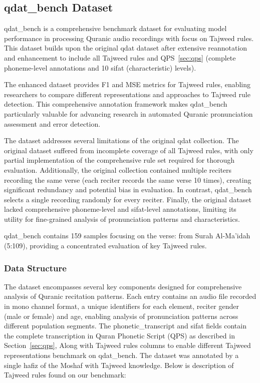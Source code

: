 \subsection{qdat\_bench Dataset}
\label{sec:qdat_bench}

qdat\_bench is a comprehensive benchmark dataset for evaluating model performance in processing Quranic audio recordings with focus on Tajweed rules. This dataset builds upon the original qdat dataset \cite{osman2021qdat} after extensive reannotation and enhancement to include all Tajweed rules and QPS~\ref{sec:qps} (complete phoneme-level annotations and 10 sifat (characteristic) levels).

The enhanced dataset provides F1 and MSE metrics for Tajweed rules, enabling researchers to compare different representations and approaches to Tajweed rule detection. This comprehensive annotation framework makes qdat\_bench particularly valuable for advancing research in automated Quranic pronunciation assessment and error detection.

The dataset addresses several limitations of the original qdat collection. The original dataset suffered from incomplete coverage of all Tajweed rules, with only partial implementation of the comprehensive rule set required for thorough evaluation. Additionally, the original collection contained multiple reciters recording the same verse (each reciter records the same verse 10 times), creating significant redundancy and potential bias in evaluation. In contrast, qdat\_bench selects a single recording randomly for every reciter. Finally, the original dataset lacked comprehensive phoneme-level and sifat-level annotations, limiting its utility for fine-grained analysis of pronunciation patterns and characteristics.

qdat\_bench contains 159 samples focusing on the verse:  from Surah Al-Ma'idah (5:109), providing a concentrated evaluation of key Tajweed rules.

\subsubsection{Data Structure}
The dataset encompasses several key components designed for comprehensive analysis of Quranic recitation patterns. Each entry contains an audio file recorded in mono channel format, a unique identifiers for each element, reciter gender (male or female) and age, enabling analysis of pronunciation patterns across different population segments. The phonetic\_transcript and sifat fields contain the complete transcription in Quran Phonetic Script (QPS) as described in Section~\ref{sec:qps}, Along with Tajweed rules columns to enable different Tajweed representations benchmark on qdat\_bench. The dataset was annotated by a single hafiz of the Moshaf with Tajweed knowledge. Below is description of Tajweed rules found on our benchmark:

